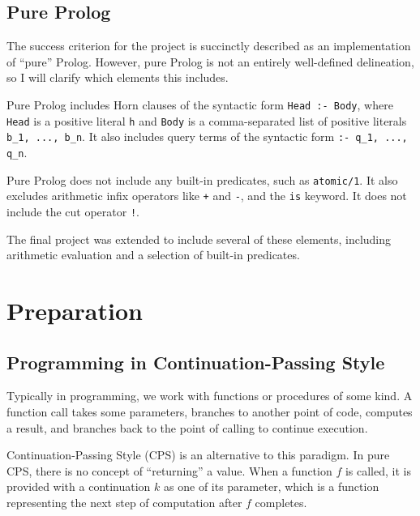 \documentclass[12pt]{article}
\begin{document}
\subsection{Pure Prolog}

The success criterion for the project is succinctly described as an implementation of ``pure'' Prolog. 
However, pure Prolog is not an entirely well-defined delineation, so I will clarify which elements this includes.

Pure Prolog includes Horn clauses of the syntactic form \verb|Head :- Body|, where \verb|Head| is a positive literal \verb|h| and \verb|Body| is a comma-separated list of positive literals \verb|b_1, ..., b_n|. 
It also includes query terms of the syntactic form \verb|:- q_1, ..., q_n|.

Pure Prolog does not include any built-in predicates, such as \verb|atomic/1|. 
It also excludes arithmetic infix operators like \verb|+| and \verb|-|, and the \verb|is| keyword. 
It does not include the cut operator \verb|!|.

The final project was extended to include several of these elements, including arithmetic evaluation and a selection of built-in predicates.

\newpage

\section{Preparation}



\subsection{Programming in Continuation-Passing Style}

Typically in programming, we work with functions or procedures of some kind. 
A function call takes some parameters, branches to another point of code, computes a result, and branches back to the point of calling to continue execution.

Continuation-Passing Style (CPS) is an alternative to this paradigm. 
In pure CPS, there is no concept of ``returning'' a value. 
When a function $f$ is called, it is provided with a continuation $k$ as one of its parameter, which is a function representing the next step of computation after $f$ completes. 
\end{document}

